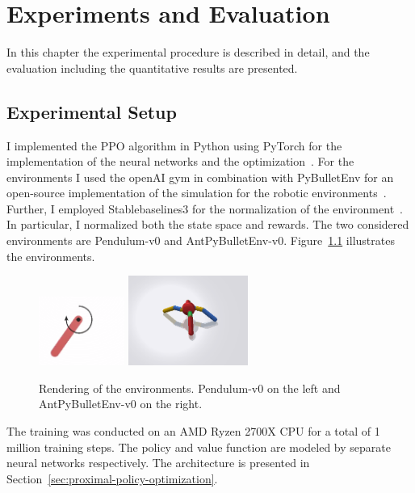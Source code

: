 \chapter{Experiments and Evaluation}\label{ch:experiments-and-evaluation}
In this chapter the experimental procedure is described in detail, and the evaluation
including the quantitative results are presented.


\section{Experimental Setup}\label{sec:experimental-setup}
I implemented the PPO algorithm in Python using PyTorch for the implementation of the
neural networks and the optimization~\cite{NEURIPS2019_9015}.
For the environments I used the openAI gym in combination with PyBulletEnv for an open-source implementation of the simulation
for the robotic environments~\cite{brockman2016openai,benelot2018}.
Further, I employed Stablebaselines3 for the normalization of the environment~\cite{stable-baselines3}.
In particular, I normalized both the state space and rewards.
The two considered environments are Pendulum-v0 and AntPyBulletEnv-v0.
Figure~\ref{fig:envs} illustrates the environments.
\begin{figure}[t]
    \centering
    \includegraphics[width=0.25\textwidth]{images/presentation/pendulum-v0.png}
    \includegraphics[width=0.35\textwidth]{images/presentation/ant.png}
    \caption{Rendering of the environments. Pendulum-v0 on the left and AntPyBulletEnv-v0 on the right.}
    \label{fig:envs}
\end{figure}
The training was conducted on an AMD Ryzen 2700X CPU for a total of 1 million training steps.
The policy and value function are modeled by separate neural networks respectively.
The architecture is presented in Section~\ref{sec:proximal-policy-optimization}.
